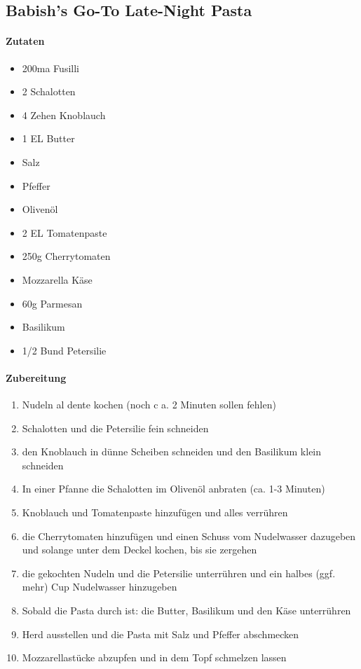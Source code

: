 \newpage
\subsection{Babish's Go-To Late-Night Pasta}
\paragraph{Zutaten}
\begin{itemize}[noitemsep]
	\item 200ma Fusilli
	\item 2 Schalotten
	\item 4 Zehen Knoblauch
	\item 1 EL Butter
	\item Salz
	\item Pfeffer
	\item Olivenöl  
	\item 2 EL Tomatenpaste 
	\item 250g Cherrytomaten
	\item Mozzarella Käse 
	\item 60g Parmesan
	\item Basilikum
	\item 1/2 Bund Petersilie
\end{itemize}
\paragraph{Zubereitung}
\begin{enumerate}[noitemsep]
	\item Nudeln al dente kochen (noch c a. 2 Minuten sollen fehlen) 
	\item Schalotten und die Petersilie fein schneiden
	\item den Knoblauch in dünne Scheiben schneiden und den Basilikum klein schneiden
	\item In einer Pfanne die Schalotten im Olivenöl anbraten (ca. 1-3 Minuten) 
	\item Knoblauch und Tomatenpaste hinzufügen und alles verrühren
	\item die Cherrytomaten hinzufügen und einen Schuss vom Nudelwasser dazugeben und solange unter dem Deckel kochen, bis sie zergehen
	\item die gekochten Nudeln und die Petersilie unterrühren und ein halbes (ggf. mehr) Cup Nudelwasser hinzugeben 
	\item Sobald die Pasta durch ist: die Butter, Basilikum und den Käse unterrühren 
	\item Herd ausstellen und die Pasta mit Salz und Pfeffer abschmecken 
	\item Mozzarellastücke abzupfen und in dem Topf schmelzen lassen
\end{enumerate}
